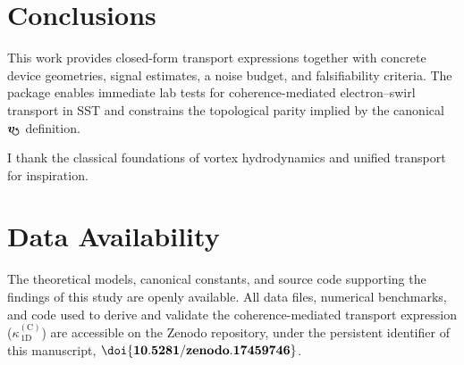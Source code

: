 \documentclass[aps,prb,preprint,amsmath,amssymb]{revtex4-2} %
\newcommand{\vswirl}{v_{\!\mkern-2mu\scriptstyle\boldsymbol{\circlearrowleft}}}
\begin{document}
    \section{Conclusions}
        This work provides closed-form transport expressions together with concrete device geometries, signal estimates, a noise budget, and falsifiability criteria. The package enables immediate lab tests for coherence-mediated electron--swirl transport in SST and constrains the topological parity implied by the canonical $\boldsymbol{\vswirl}$ definition.

        \begin{acknowledgments}
            I thank the classical foundations of vortex hydrodynamics and unified transport \cite{Madelung1927,Peierls1929,AllenFeldman1993,Simoncelli2022} for inspiration.
        \end{acknowledgments}

    \section*{Data Availability}

        The theoretical models, canonical constants, and source code supporting the findings of this study are openly available. All data files, numerical benchmarks, and code used to derive and validate the coherence-mediated transport expression ($\kappa^{(\mathrm C)}_{\!\,1\mathrm D}$) are accessible on the Zenodo repository, under the persistent identifier of this manuscript, $\mathbf{\doi{\paperdoi}}$.
\end{document}
